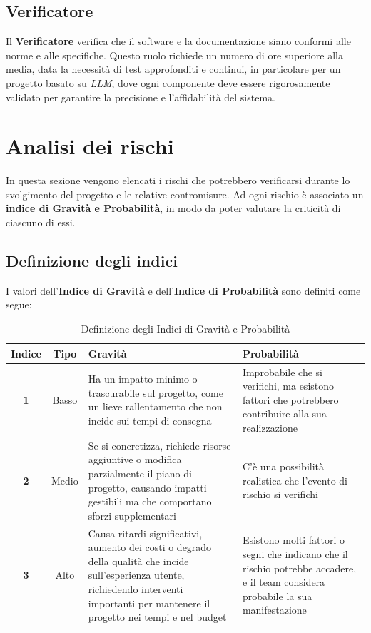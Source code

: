 \documentclass{article}
\begin{document}
\subsection{Verificatore}
Il \textbf{Verificatore} verifica che il software e la documentazione siano conformi alle norme e alle specifiche. Questo ruolo richiede un numero di ore superiore alla media, data la necessità di test approfonditi e continui, in particolare per un progetto basato su \emph{LLM}, dove ogni componente deve essere rigorosamente validato per garantire la precisione e l’affidabilità del sistema.


\newpage
\section{Analisi dei rischi}
In questa sezione vengono elencati i rischi che potrebbero verificarsi durante lo svolgimento del progetto e le relative contromisure. Ad ogni rischio è associato un \textbf{indice di Gravità e Probabilità},
in modo da poter valutare la criticità di ciascuno di essi.
\subsection{Definizione degli indici}
I valori dell'\textbf{Indice di Gravità} e dell'\textbf{Indice di Probabilità} sono definiti come segue:
\begin{table}[h!]
    \centering
    \begin{tabular}{|c|c|p{6cm}|p{6cm}|}
        \hline
        \textbf{Indice} & \textbf{Tipo} & \textbf{Gravità} & \textbf{Probabilità} \\
        \hline
        \textbf{1} & Basso & Ha un impatto minimo o trascurabile sul progetto, come un lieve rallentamento che non incide sui tempi di consegna & Improbabile che si verifichi, ma esistono fattori che potrebbero contribuire alla sua realizzazione \\
        \hline
        \textbf{2} & Medio & Se si concretizza, richiede risorse aggiuntive o modifica parzialmente il piano di progetto, causando impatti gestibili ma che comportano sforzi supplementari & C'è una possibilità realistica che l'evento di rischio si verifichi \\
        \hline
        \textbf{3} & Alto & Causa ritardi significativi, aumento dei costi o degrado della qualità che incide sull’esperienza utente, richiedendo interventi importanti per mantenere il progetto nei tempi e nel budget & Esistono molti fattori o segni che indicano che il rischio potrebbe accadere, e il team considera probabile la sua manifestazione \\
        \hline
    \end{tabular}
    \caption{Definizione degli Indici di Gravità e Probabilità}
    \label{tab:definizione_indici}
\end{table}
    
\end{document}

